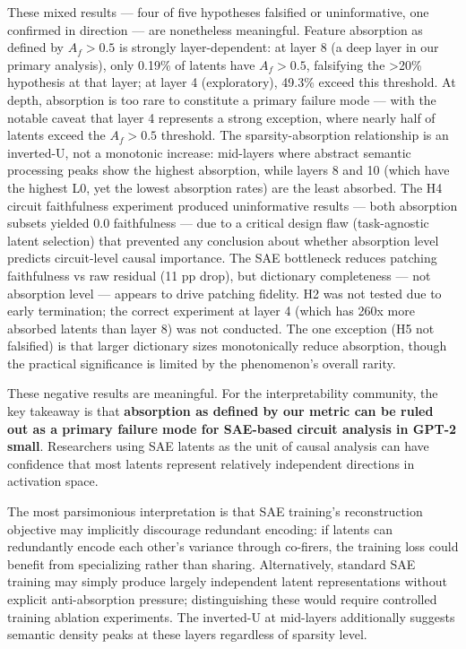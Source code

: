 \documentclass{article}
\begin{document}
These mixed results --- four of five hypotheses falsified or uninformative, one confirmed in direction --- are nonetheless meaningful. Feature absorption as defined by $A_f > 0.5$ is strongly layer-dependent: at layer 8 (a deep layer in our primary analysis), only 0.19\% of latents have $A_f > 0.5$, falsifying the >20\% hypothesis at that layer; at layer 4 (exploratory), 49.3\% exceed this threshold. At depth, absorption is too rare to constitute a primary failure mode --- with the notable caveat that layer 4 represents a strong exception, where nearly half of latents exceed the $A_f > 0.5$ threshold. The sparsity-absorption relationship is an inverted-U, not a monotonic increase: mid-layers where abstract semantic processing peaks show the highest absorption, while layers 8 and 10 (which have the highest L0, yet the lowest absorption rates) are the least absorbed. The H4 circuit faithfulness experiment produced uninformative results --- both absorption subsets yielded 0.0 faithfulness --- due to a critical design flaw (task-agnostic latent selection) that prevented any conclusion about whether absorption level predicts circuit-level causal importance. The SAE bottleneck reduces patching faithfulness vs raw residual (11 pp drop), but dictionary completeness --- not absorption level --- appears to drive patching fidelity. H2 was not tested due to early termination; the correct experiment at layer 4 (which has 260x more absorbed latents than layer 8) was not conducted. The one exception (H5 not falsified) is that larger dictionary sizes monotonically reduce absorption, though the practical significance is limited by the phenomenon's overall rarity.

These negative results are meaningful. For the interpretability community, the key takeaway is that \textbf{absorption as defined by our metric can be ruled out as a primary failure mode for SAE-based circuit analysis in GPT-2 small}. Researchers using SAE latents as the unit of causal analysis can have confidence that most latents represent relatively independent directions in activation space.

The most parsimonious interpretation is that SAE training's reconstruction objective may implicitly discourage redundant encoding: if latents can redundantly encode each other's variance through co-firers, the training loss could benefit from specializing rather than sharing. Alternatively, standard SAE training may simply produce largely independent latent representations without explicit anti-absorption pressure; distinguishing these would require controlled training ablation experiments. The inverted-U at mid-layers additionally suggests semantic density peaks at these layers regardless of sparsity level.
\end{document}
